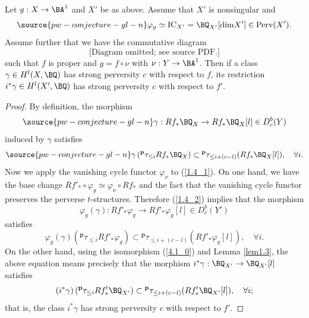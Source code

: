 \begin{prop}
\notready\label{prop1.4}
Let $g: X \to \BA^1$ and $X'$ be as above. Assume that $X'$ is nonsingular and
\begin{equation}\label{4.1_0}
\source{pw-conjecture-gl-n}
\varphi_g \simeq \mathrm{IC}_{X'} = \BQ_{X'}[\mathrm{dim}X'] \in \mathrm{Perv}(X').
\end{equation}
Assume further that we have the commutative diagram
\begin{equation*}
\text{[Diagram omitted; see source PDF.]}
\end{equation*}
such that $f$ is proper and $g =   f\circ \nu$ with $\nu: Y \to \BA^1$. Then if a class $\gamma \in H^l(X, \BQ)$ has strong perversity $c$ with respect to $f$, its restriction $i^*\gamma \in H^l(X', \BQ)$ has strong perversity $c$ with respect to $f'$.
\end{prop}


\begin{proof}
By definition, the morphism
\begin{equation}\label{1.4_1}
\source{pw-conjecture-gl-n}
\gamma: Rf_* \BQ_X \to Rf_* \BQ_X[l] \in D^b_c(Y)
\end{equation}
induced by $\gamma$ satisfies
\begin{equation}\label{1.4_2}
\source{pw-conjecture-gl-n}
\gamma \left({^\mathbf{p}\tau_{\leq i} Rf_* \BQ_X}\right) \subset {^\mathbf{p}\tau_{\leq i+(c-l)}} (Rf_* \BQ_X[l]), \quad \forall i.
\end{equation}
Now we apply the vanishing cycle functor $\varphi_\nu$ to (\ref{1.4_1}). On one hand, we have the base change $Rf'_* \circ \varphi_g \simeq \varphi_\nu\circ Rf_*$ and the fact that the vanishing cycle functor preserves the perverse $t$-structures. Therefore (\ref{1.4_2}) implies  that the morphism
\[
\varphi_g(\gamma): Rf'_* \varphi_g \to Rf'_* \varphi_g[l] \in D^b_c(Y')
\]
satisfies
\[
\varphi_g(\gamma) \left({^\mathbf{p}\tau_{\leq i}} Rf'_* \varphi_g\right) \subset {^\mathbf{p}\tau_{\leq i+(c-l)}} (Rf'_* \varphi_g[l]), \quad \forall i.
\]
On the other hand, using the isomorphism (\ref{4.1_0}) and Lemma \ref{lem1.3}, the above equation means precisely that the morphism $i^*\gamma : \BQ_{X'} \to \BQ_{X'}[l]$ satisfies
\begin{equation*}
(i^*\gamma) \left({^\mathbf{p}\tau_{\leq i} Rf'_* \BQ_{X'}}\right) \subset {^\mathbf{p}\tau_{\leq i+(c-l)}} (Rf'_* \BQ_{X'}[l]), \quad \forall i;
\end{equation*}
that is, the class $i^*\gamma$ has strong perversity $c$ with respect to $f'$.
\end{proof}
